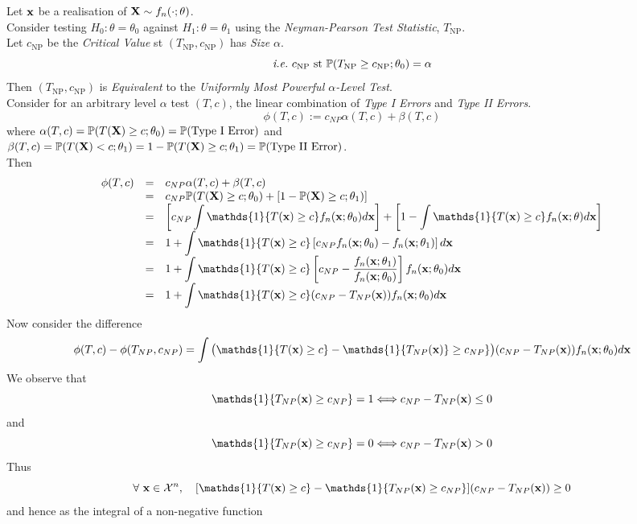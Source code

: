 \documentclass[11pt,a4paper]{article}
\begin{document}
Let $\textbf{x}$ be a realisation of $\textbf{X}\sim f_n(\cdot;\theta)$.\\
Consider testing $H_0:\theta=\theta_0$ against $H_1:\theta=\theta_1$ using the \textit{Neyman-Pearson Test Statistic}, $T_\text{NP}$.\\
Let $c_\text{NP}$ be the \textit{Critical Value} st $(T_\text{NP},c_\text{NP})$ has \textit{Size} $\alpha$.
$$\textit{i.e.}\ c_\text{NP}\text{ st }\mathbb{P}(T_\text{NP}\geq c_\text{NP};\theta_0)=\alpha$$
Then $(T_\text{NP},c_\text{NP})$ is \textit{Equivalent} to the \textit{Uniformly Most Powerful $\alpha$-Level Test}.\\

Consider for an arbitrary level $\alpha$ test $(T,c)$, the linear combination of \textit{Type I Errors} and \textit{Type II Errors}.
$$\phi(T,c):=c_{NP}\alpha(T,c)+\beta(T,c)$$
where $\alpha(T,c)=\mathbb{P}(T(\textbf{X})\geq c;\theta_0)=\mathbb{P}(\text{Type I Error})$ and\\ ${\beta(T,c)=\mathbb{P}(T(\textbf{X})<c;\theta_1)=1-\mathbb{P}(T(\textbf{X})\geq c;\theta_1)=\mathbb{P}(\text{Type II Error})}$.\\
Then
\[\begin{array}{rcl}
\phi(T,c)&=&c_{NP}\alpha(T,c)+\beta(T,c)\\
&=&c_{NP}\prob(T(\X)\geq c;\theta_0)+[1-\prob(\X)\geq c;\theta_1)]\\
&=&{\displaystyle\left[c_{NP}\int\mathds{1}\{T(\x)\geq c\}f_n(\x;\theta_0)d\x\right]+\left[1-\int\mathds{1}\{T(\x)\geq c\}f_n(\x;\theta)d\x\right]}\\
&=&{\displaystyle1+\int\mathds{1}\{T(\x)\geq c\}\left[c_{NP}f_n(\x;\theta_0)-f_n(\x;\theta_1)\right]d\x}\\
&=&{\displaystyle 1+\int\mathds{1}\{T(\x)\geq c\}\left[c_{NP}-\dfrac{f_n(\x;\theta_1)}{f_n(\x;\theta_0)}\right]f_n(\x;\theta_0)d\x}\\
&=&{\displaystyle1+\int\mathds{1}\{T(\x)\geq c\}(c_{NP}-T_{NP}(\x))f_n(\x;\theta_0)d\x}
\end{array}\]
Now consider the difference
$$\phi(T,c)-\phi(T_{NP},c_{NP})=\int\big(\mathds{1}\{T(\x)\geq c\}-\mathds{1}\{T_{NP}(\x)\}\geq c_{NP}\}\big)(c_{NP}-T_{NP}(\x))f_n(\x;\theta_0)d\x$$
We observe that
$$\mathds{1}\{T_{NP}(\x)\geq c_{NP}\}=1\Longleftrightarrow c_{NP}-T_{NP}(\x)\leq0$$
and
$$\mathds{1}\{T_{NP}(\x)\geq c_{NP}\}=0\Longleftrightarrow c_{NP}-T_{NP}(\x)>0$$
Thus
$$\forall\ \x\in\mathcal{X}^n,\quad[\mathds{1}\{T(\x)\geq c\}-\mathds{1}\{T_{NP}(\x)\geq c_{NP}\}](c_{NP}-T_{NP}(\x))\geq 0$$
and hence as the integral of a non-negative function
\end{document}
